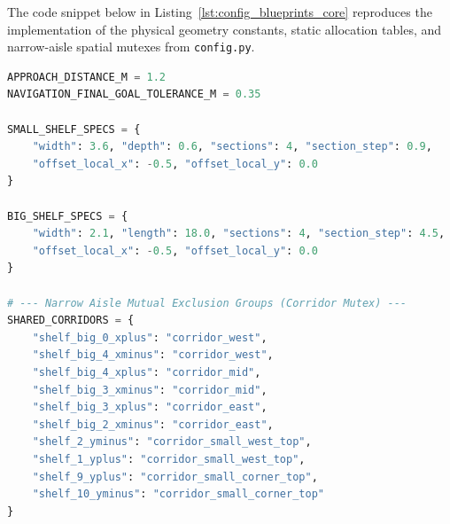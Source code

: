 The code snippet below in Listing~\ref{lst:config_blueprints_core} reproduces the implementation of the physical geometry constants, static allocation tables, and narrow-aisle spatial mutexes from \texttt{config.py}.

\begin{lstlisting}[language=Python, caption={Global physical constants and narrow aisle mutual exclusion mappings.}, label={lst:config_blueprints_core}]
APPROACH_DISTANCE_M = 1.2
NAVIGATION_FINAL_GOAL_TOLERANCE_M = 0.35

SMALL_SHELF_SPECS = {
    "width": 3.6, "depth": 0.6, "sections": 4, "section_step": 0.9,
    "offset_local_x": -0.5, "offset_local_y": 0.0
}

BIG_SHELF_SPECS = {
    "width": 2.1, "length": 18.0, "sections": 4, "section_step": 4.5,
    "offset_local_x": -0.5, "offset_local_y": 0.0
}

# --- Narrow Aisle Mutual Exclusion Groups (Corridor Mutex) ---
SHARED_CORRIDORS = {
    "shelf_big_0_xplus": "corridor_west",
    "shelf_big_4_xminus": "corridor_west",
    "shelf_big_4_xplus": "corridor_mid",
    "shelf_big_3_xminus": "corridor_mid",
    "shelf_big_3_xplus": "corridor_east",
    "shelf_big_2_xminus": "corridor_east",
    "shelf_2_yminus": "corridor_small_west_top",
    "shelf_1_yplus": "corridor_small_west_top",
    "shelf_9_yplus": "corridor_small_corner_top",
    "shelf_10_yminus": "corridor_small_corner_top"
}
\end{lstlisting}